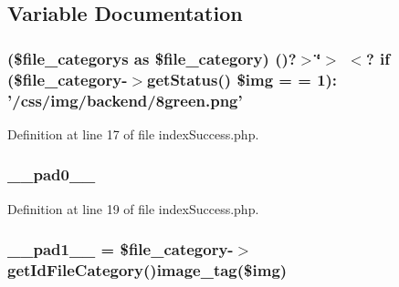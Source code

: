 \subsection{Variable Documentation}
\hypertarget{backend_2modules_2file_2templates_2index_success_8php_a0829c4f6ce824318b248e67e032d85d3}{
\subsubsection[{\$img}]{ (\$file\-\_\-categorys as \$file\-\_\-category) ()?$>$\char`\"{}$>$ $<$? if (\$file\-\_\-category-\/$>$get\-Status() \$img = = 1)\-: '/css/img/backend/8green.\-png'}}\label{backend_2modules_2file_2templates_2index_success_8php_a0829c4f6ce824318b248e67e032d85d3}


Definition at line 17 of file index\-Success.\-php.

\hypertarget{backend_2modules_2file_2templates_2index_success_8php_a8e01dcc96c43199448ee66f7c2ae8ea6}{
\subsubsection[{\-\_\-\-\_\-pad0\-\_\-\-\_\-}]{ \-\_\-\-\_\-pad0\-\_\-\-\_\-}}\label{backend_2modules_2file_2templates_2index_success_8php_a8e01dcc96c43199448ee66f7c2ae8ea6}


Definition at line 19 of file index\-Success.\-php.

\hypertarget{backend_2modules_2file_2templates_2index_success_8php_abcb9288aac8a832fb63f4585c30ea142}{
\subsubsection[{\-\_\-\-\_\-pad1\-\_\-\-\_\-}]{ \-\_\-\-\_\-pad1\-\_\-\-\_\- = \$file\-\_\-category-\/$>$get\-Id\-File\-Category()image\-\_\-tag(\$img)}}\label{backend_2modules_2file_2templates_2index_success_8php_abcb9288aac8a832fb63f4585c30ea142}


